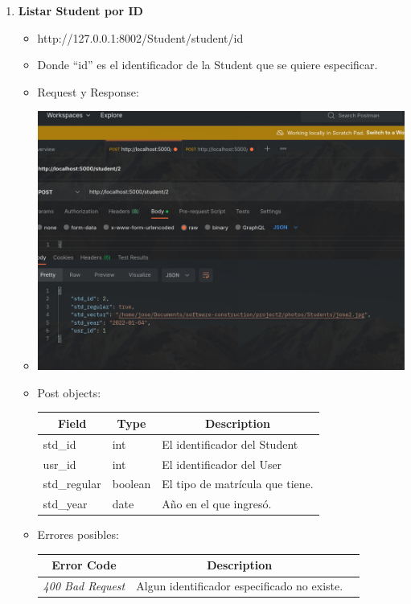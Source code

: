 \documentclass{article}
\begin{document}
\begin{enumerate}
    \item \textbf{Listar Student por ID}
    \begin{itemize}
        \item http://127.0.0.1:8002/Student/student/id
        \item Donde ``id'' es el identificador de la Student que se
        quiere especificar.
        \item Request y Response:
        \item \includegraphics[scale=.5]{assets/student/student2.png}
        \item Post objects: \begin{table}[H] \centering \begin{tabular}{|l|l|l|}
        \hline \multicolumn{1}{|c|}{\textbf{Field}} &
        \multicolumn{1}{c|}{\textbf{Type}} &
        \multicolumn{1}{c|}{\textbf{Description}} \\ \hline std\_id & int & El
        identificador del Student \\ \hline usr\_id & int & El identificador del
        User \\ \hline std\_regular & boolean & El tipo de matrícula que tiene.
        \\ \hline std\_year & date & Año en el que ingresó. \\ \hline
        \end{tabular} \end{table} \item Errores posibles: \begin{table}[H] \centering
        \begin{tabular}{|c|c|l|} \hline \textbf{Error Code} &
        \textbf{Description} \\ \hline \textit{400 Bad Request} & Algun
        identificador especificado no existe. \\ \hline \end{tabular}
        \end{table}
    \end{itemize}


\end{enumerate}
\end{document}
